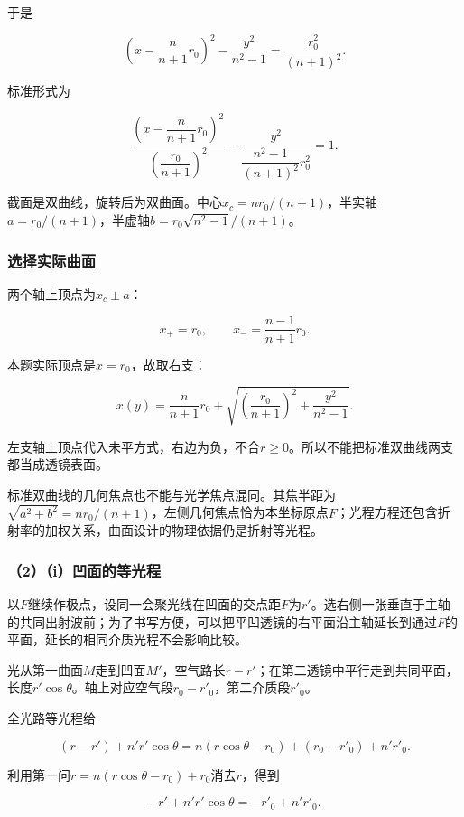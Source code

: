 \documentclass[12pt,a4paper,fontset=fandol]{ctexart}
\begin{document}
于是

\[
\left(x-\frac{n}{n+1}r_0\right)^2
-\frac{y^2}{n^2-1}
=\frac{r_0^2}{(n+1)^2}.
\]

标准形式为

\[
\boxed{
\frac{\left(x-\dfrac{n}{n+1}r_0\right)^2}
{\left(\dfrac{r_0}{n+1}\right)^2}
-\frac{y^2}{\dfrac{n^2-1}{(n+1)^2}r_0^2}=1}.
\]

截面是双曲线，旋转后为双曲面。中心\(x_c=nr_0/(n+1)\)，半实轴\(a=r_0/(n+1)\)，半虚轴\(b=r_0\sqrt{n^2-1}/(n+1)\)。

\subsubsection{选择实际曲面}\label{ux9009ux62e9ux5b9eux9645ux66f2ux9762}

两个轴上顶点为\(x_c\pm a\)：

\[
x_+=r_0,\qquad x_-=\frac{n-1}{n+1}r_0.
\]

本题实际顶点是\(x=r_0\)，故取右支：

\[
\boxed{
x(y)=\frac{n}{n+1}r_0
+\sqrt{\left(\frac{r_0}{n+1}\right)^2
+\frac{y^2}{n^2-1}}}.
\]

左支轴上顶点代入未平方式，右边为负，不合\(r\geq0\)。所以不能把标准双曲线两支都当成透镜表面。

标准双曲线的几何焦点也不能与光学焦点混同。其焦半距为\(\sqrt{a^2+b^2}=nr_0/(n+1)\)，左侧几何焦点恰为本坐标原点\(F\)；光程方程还包含折射率的加权关系，曲面设计的物理依据仍是折射等光程。

\subsubsection{（2）（i）凹面的等光程}\label{iux51f9ux9762ux7684ux7b49ux5149ux7a0b}

以\(F\)继续作极点，设同一会聚光线在凹面的交点距\(F\)为\(r'\)。选右侧一张垂直于主轴的共同出射波前；为了书写方便，可以把平凹透镜的右平面沿主轴延长到通过\(F\)的平面，延长的相同介质光程不会影响比较。

光从第一曲面\(M\)走到凹面\(M'\)，空气路长\(r-r'\)；在第二透镜中平行走到共同平面，长度\(r'\cos\theta\)。轴上对应空气段\(r_0-r'_0\)，第二介质段\(r'_0\)。

全光路等光程给

\[
(r-r')+n'r'\cos\theta
=n(r\cos\theta-r_0)+(r_0-r'_0)+n'r'_0.
\]

利用第一问\(r=n(r\cos\theta-r_0)+r_0\)消去\(r\)，得到

\[
-r'+n'r'\cos\theta=-r'_0+n'r'_0.
\]
\end{document}
